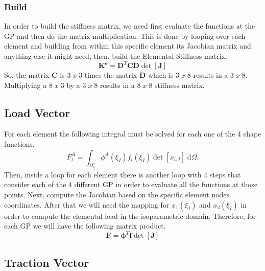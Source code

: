 \documentclass[11pt, a4paper]{article}
\numberwithin{equation}{section}
\begin{document}
\subsubsection{Build}

In order to build the stiffness matrix, we need first evaluate the functions at the GP and then do the matrix multiplication. This is done by looping over each element and building from within this specific element its Jacobian matrix and anything else it might need, then, build the Elemental Stiffness matrix.
\begin{equation}
\mathbf{K^e} = \mathbf{D}^T \mathbf{C} \mathbf{D} \det[\mathbf{J}]
\end{equation}
So, the matrix $\mathbf{C}$ is $3 \; x\;3$ times the matrix $\mathbf{D}$ which is $3\;x\;8$ results in a $3\;x\;8$. Multiplying a $8\;x\;3$ by a $3\;x\;8$ results in a $8\;x\;8$  stiffness matrix.



\subsection{Load Vector}

For each element the following integral must be solved for each one of the 4 shape functions.
\begin{equation}
F_i^A = \int_{\Omega^e_\xi} \phi^A(\xi_I) f_i(\xi_I) \det[x_{i,I}] \; \mathrm{d} \Omega.
\end{equation}
Then, inside a loop for each element there is another loop with 4 steps that consider each of the 4 different GP in order to evaluate all the functions at those points. Next, compute the Jacobian based on the specific element nodes coordinates. After that we will need the mapping for $x_1 (\xi_I)$ and $x_2 (\xi_I)$ in order to compute the elemental load in the isoparametric domain. Therefore, for each GP we will have the following matrix product.
\begin{equation}
\mathbf{F} = \boldsymbol \phi^T \mathbf{f} \det[\mathbf{J}]
\end{equation}




\subsection{Traction Vector}
\end{document}
